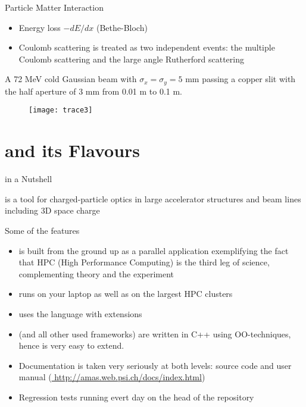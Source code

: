 \documentclass[xcolor=pdftex,table,10pt,yellow,mathserif]{beamer}
\begin{document}
\begin{frame}{Particle Matter Interaction}{}
 \begin{itemize}
 \item Energy loss $-dE/dx$ (Bethe-Bloch)
 \item Coulomb scattering is treated as two independent events: the multiple Coulomb scattering and the large angle Rutherford scattering
 \end{itemize}
A 72 MeV cold Gaussian beam with $\sigma_x=\sigma_y=5$ mm passing a copper slit with the half aperture of $3$ mm from 0.01 m to 0.1 m. 
\begin{figure}[htb]
   \centering
  \texttt{[image: trace3]}
\end{figure}

\end{frame}




\section{\opal and its Flavours}

\begin{frame}{\opal in a Nutshell} {}
\begin{alertblock}{}  
 \opal is a tool for charged-particle optics in large
accelerator structures and beam lines including 3D space charge
\end{alertblock}
\begin{block}{Some of the features}  
\begin{itemize}
\item \opal is built from the ground up as a parallel application exemplifying the fact that HPC (High Performance Computing) 
is the third leg of science, complementing theory and the experiment
\item  \opal runs on your laptop as well as on the largest HPC clusters
\item \opal uses the \mad language with extensions
\item \opal (and all other used frameworks) are written in C++ using OO-techniques, hence \opal is very easy to extend.
\item Documentation is taken very seriously at both levels: source code and user manual (\url{ http://amas.web.psi.ch/docs/index.html})
\item Regression tests running evert day on the head of the repository
\end{itemize}
\end{block}
\end{frame}
\end{document}
